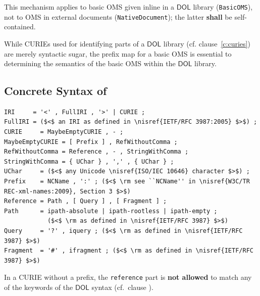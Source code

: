 \documentclass[10pt,fleqn,final]{scrreprt}
\makeatletter
\newcommand*{\cf}{cf.\@\xspace}
\newcommand*{\eg}{e.g.\@\xspace}
\newcommand*\CommentAuthor{}
\renewcommand*\CommentAuthor{#1}}
\newcommand*\CommentDate{}
\renewcommand*\CommentDate{#1}}
\newcommand*\CommentId{}
\renewcommand*\CommentId{#1}}
\newcommand*\CommentType{}
\renewcommand*\CommentType{#1}}
\newcommand*{\SetCommentColorByType}[1]{%
\edef\localType{{#1}}%
\expandafter\ifstrequal\localType{q-aut}{\colorlet{CommentColor}{red}}{%
\expandafter\ifstrequal\localType{q-all}{\colorlet{CommentColor}{orange}}{%
\expandafter\ifstrequal\localType{todo}{\colorlet{CommentColor}{orange}}{%
\expandafter\ifstrequal\localType{fyi}{\colorlet{CommentColor}{lightgray}}{%
\colorlet{CommentColor}{yellow}}}}}}
\newcommand*{\SetCommentPrefixByType}[1]{%
\edef\localType{{#1}}%
\expandafter\@ifmtarg\localType{%
\edef\CommentPrefix{}%
}{%
\caseupper[q]{#1}%
\edef\CommentPrefix{\thestring: }%
}}
\newcommand*{\initComment}[1]{%
\setkeys{Comment}{#1}%
\SetCommentColorByType{\CommentType}%
\relax%
\SetCommentPrefixByType{\CommentType}%
\relax%
}
\newcommand*{\todonote}[2][]{%
\initComment{#1}%
\pdfcomment[author=\CommentAuthor,color=CommentColor,date=\CommentDate,id=\CommentId]{%
\CommentPrefix
#2}}
\renewcommand*{\todonote}[2][]{%
\initComment{#1}%
\ednote{\CommentPrefix #2}}
\newcommand*{\syntax}[1]{\texttt{#1}}
\newcommand*{\notallowed}{\textbf{not allowed}\xspace}
\newcommand*{\shall}{\textbf{shall}\xspace}
\newcommand*{\DOL}{\ensuremath{\mathsf{DOL}}\xspace}
\newcommand{\clauserefname}{clause}
\newcommand{\cref}[1]{\clauserefname~\ref{#1}}
\newcommand{\sclause}[1]{\section{#1}}
\newcommand{\ssclause}[1]{\subsection{#1}}
\newcommand{\nisref}[1]{#1}
\newenvironment{definitions}[0]{\medskip }{}
\makeatother
\begin{document}
\begin{definitions}
This mechanism applies to basic OMS given inline in a \DOL library (\syntax{BasicOMS}), not to OMS in external documents (\syntax{NativeDocument}); the latter \shall be self-contained.

While CURIEs used for identifying parts of a \DOL library (\cf \cref{c:curies}) are merely syntactic 
sugar, the prefix map for a basic OMS is essential to determining the semantics of the basic OMS 
within the \DOL library. 




\ssclause{Concrete Syntax of}\label{a:dol-text:mappings}

\begin{lstlisting}[language=ebnf,escapeinside={()}]
IRI     = '<' , FullIRI , '>' | CURIE ;
FullIRI = ($<$ an IRI as defined in \nisref{IETF/RFC 3987:2005} $>$) ;
CURIE     = MaybeEmptyCURIE , - ;
MaybeEmptyCURIE = [ Prefix ] , RefWithoutComma ;
RefWithoutComma = Reference , - , StringWithComma ;
StringWithComma = { UChar } , ',' , { UChar } ;
UChar     = ($<$ any Unicode \nisref{ISO/IEC 10646} character $>$) ;
Prefix    = NCName , ':' ; ($<$ \rm see ``NCName'' in \nisref{W3C/TR REC-xml-names:2009}, Section 3 $>$)
Reference = Path , [ Query ] , [ Fragment ] ;
Path      = ipath-absolute | ipath-rootless | ipath-empty ;
            ($<$ \rm as defined in \nisref{IETF/RFC 3987} $>$)
Query     = '?' , iquery ; ($<$ \rm as defined in \nisref{IETF/RFC 3987} $>$)
Fragment  = '#' , ifragment ; ($<$ \rm as defined in \nisref{IETF/RFC 3987} $>$)
\end{lstlisting}

In a CURIE without a prefix, the \syntax{reference} part is \notallowed to match any of the keywords of the \DOL syntax (cf.\ clause \label{c:keywords}).

\medspace










\end{definitions}
\end{document}
